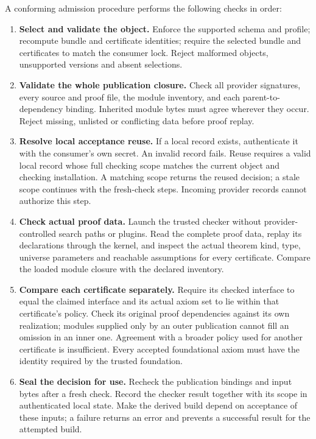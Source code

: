 \documentclass[11pt]{article}
\begin{document}
A conforming admission procedure performs the following checks in order:
\begin{enumerate}
\item \textbf{Select and validate the object.} Enforce the supported schema and
profile; recompute bundle and certificate identities; require the selected
bundle and certificates to match the consumer lock. Reject malformed objects,
unsupported versions and absent selections.
\item \textbf{Validate the whole publication closure.} Check all provider
signatures, every source and proof file, the module inventory, and each
parent-to-dependency binding. Inherited module bytes must agree wherever they
occur. Reject missing, unlisted or conflicting data before proof replay.
\item \textbf{Resolve local acceptance reuse.} If a local record exists,
authenticate it with the consumer's own secret. An invalid record fails.
Reuse requires a valid local record whose full checking scope matches the
current object and checking installation. A matching scope returns the reused
decision; a stale scope continues with the fresh-check steps. Incoming provider records cannot authorize this step.
\item \textbf{Check actual proof data.} Launch the trusted checker without
provider-controlled search paths or plugins. Read the complete proof data,
replay its declarations through the kernel, and inspect the actual theorem
kind, type, universe parameters and reachable assumptions for every certificate.
Compare the loaded module closure with the declared inventory.
\item \textbf{Compare each certificate separately.} Require its checked
interface to equal the claimed interface and its actual axiom set to lie
within that certificate's policy. Check its original proof dependencies against
its own realization; modules supplied only by an outer publication cannot fill
an omission in an inner one. Agreement with a broader policy used for
another certificate is insufficient. Every accepted foundational axiom must
have the identity required by the trusted foundation.
\item \textbf{Seal the decision for use.} Recheck the publication bindings and
input bytes after a fresh check. Record the checker result together with its
scope in authenticated local state. Make the derived build depend on acceptance
of these inputs; a failure returns an error and prevents a successful result
for the attempted build.
\end{enumerate}
\end{document}
